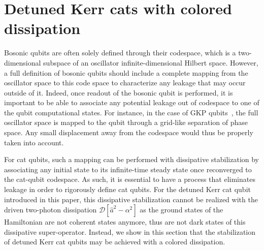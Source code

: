 \documentclass[%
 reprint,
 superscriptaddress,
 amsmath,
 amssymb,
 aps,
 pra,
 10pt
]{revtex4-2}
\begin{document}
\section{\label{sec:colored}Detuned Kerr cats with colored dissipation}

Bosonic qubits are often solely defined through their codespace, which is a two-dimensional subspace of an oscillator infinite-dimensional Hilbert space. However, a full definition of bosonic qubits should include a complete mapping from the oscillator space to this code space to characterize any leakage that may occur outside of it. Indeed, once readout of the bosonic qubit is performed, it is important to be able to associate any potential leakage out of codespace to one of the qubit computational states. For instance, in the case of GKP qubits~\cite{Gottesman2001,CampagneIbarcq2020}, the full oscillator space is mapped to the qubit through a grid-like separation of phase space. Any small displacement away from the codespace would thus be properly taken into account.

For cat qubits, such a mapping can be performed with dissipative stabilization by associating any initial state to its infinite-time steady state once reconverged to the cat-qubit codespace. As such, it is essential to have a process that eliminates leakage in order to rigorously define cat qubits. For the detuned Kerr cat qubit introduced in this paper, this dissipative stabilization cannot be realized with the driven two-photon dissipation $\mathcal{D}[\hat{a}^2 - \alpha^2]$ as the ground states of the Hamiltonian are not coherent states anymore, thus are not dark states of this dissipative super-operator. Instead, we show in this section that the stabilization of detuned Kerr cat qubits may be achieved with a colored dissipation.
\end{document}
